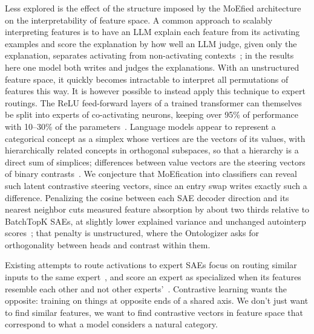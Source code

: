 Less explored is the effect of the structure imposed by the MoEfied
architecture on the interpretability of feature space. A common approach
to scalably interpreting features is to have an LLM explain each feature
from its activating examples and score the explanation by how well an
LLM judge, given only the explanation, separates activating from
non-activating contexts~\cite{paulo2025}; in the results here one model
both writes and judges the explanations. With an unstructured feature
space, it quickly becomes intractable to interpret all permutations of
features this way. It is however possible to instead apply this
technique to expert routings. The ReLU feed-forward layers of a trained
transformer can themselves be split into experts of co-activating
neurons, keeping over 95\% of performance with 10--30\% of the
parameters~\cite{zhang2022}. Language models appear to represent a
categorical concept as a simplex whose vertices are the vectors of its
values, with hierarchically related concepts in orthogonal subspaces, so
that a hierarchy is a direct sum of simplices; differences between value
vectors are the steering vectors of binary contrasts~\cite{park2025}. We
conjecture that MoEfication into classifiers can reveal such latent
contrastive steering vectors, since an entry swap writes exactly such a
difference. Penalizing the cosine between each SAE decoder direction and
its nearest neighbor cuts measured feature absorption by about two
thirds relative to BatchTopK SAEs, at slightly lower explained variance
and unchanged autointerp scores~\cite{korznikov2025}; that penalty is
unstructured, where the Ontologizer asks for orthogonality between heads
and contrast within them.

Existing attempts to route activations to expert SAEs focus on routing
similar inputs to the same expert~\cite{mudide2025}, and score an expert
as specialized when its features resemble each other and not other
experts'~\cite{xu2025redundancydiversespecializedmultiexpert}.
Contrastive learning wants the
opposite: training on things at opposite ends of a shared axis. We don't
just want to find similar features, we want to find contrastive vectors
in feature space that correspond to what a model considers a natural
category.


